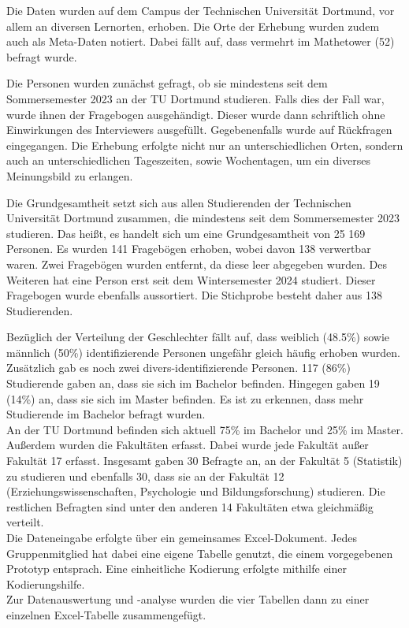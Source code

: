\documentclass[11pt, a4paper]{article}
\begin{document}
Die Daten wurden auf dem Campus der Technischen Universität Dortmund, vor allem an diversen Lernorten, erhoben. Die Orte der Erhebung wurden zudem auch als Meta-Daten notiert. Dabei fällt auf, dass vermehrt im Mathetower (52) befragt wurde.

Die Personen wurden zunächst gefragt, ob sie mindestens seit dem Sommersemester 2023 an der TU Dortmund studieren. Falls dies der Fall war, wurde ihnen der Fragebogen ausgehändigt. Dieser wurde dann schriftlich ohne Einwirkungen des Interviewers ausgefüllt. Gegebenenfalls wurde auf Rückfragen eingegangen.
Die Erhebung erfolgte nicht nur an unterschiedlichen Orten, sondern auch an unterschiedlichen Tageszeiten, sowie Wochentagen, um ein diverses Meinungsbild zu erlangen.

Die Grundgesamtheit setzt sich aus allen Studierenden der Technischen Universität Dortmund zusammen, die mindestens seit dem Sommersemester 2023 studieren. Das heißt, es handelt sich um eine Grundgesamtheit von 25 169 Personen. 
Es wurden 141 Fragebögen erhoben, wobei davon 138 verwertbar waren. Zwei Fragebögen wurden entfernt, da diese leer abgegeben wurden. Des Weiteren hat eine Person erst seit dem Wintersemester 2024 studiert. Dieser Fragebogen wurde ebenfalls aussortiert.
Die Stichprobe besteht daher aus 138 Studierenden.

Bezüglich der Verteilung der Geschlechter fällt auf, dass weiblich (48.5\%) sowie männlich (50\%) identifizierende Personen ungefähr gleich häufig erhoben wurden. Zusätzlich gab es noch zwei divers-identifizierende Personen. 
117 (86\%) Studierende gaben an, dass sie sich im Bachelor befinden. Hingegen gaben        19 (14\%) an, dass sie sich im Master befinden. Es ist zu erkennen, dass mehr Studierende im Bachelor befragt wurden. \\
An der TU Dortmund befinden sich aktuell 75\% im Bachelor und 25\% im Master.\\
Außerdem wurden die Fakultäten erfasst. Dabei wurde jede Fakultät außer Fakultät 17 erfasst. Insgesamt gaben 30 Befragte an, an der Fakultät 5 (Statistik) zu studieren und ebenfalls 30, dass sie an der Fakultät 12 (Erziehungswissenschaften, Psychologie und Bildungsforschung) studieren. Die restlichen Befragten sind unter den anderen 14 Fakultäten etwa gleichmäßig verteilt.\\

Die Dateneingabe erfolgte über ein gemeinsames Excel-Dokument. Jedes Gruppenmitglied hat dabei eine eigene Tabelle genutzt, die einem vorgegebenen Prototyp entsprach. Eine einheitliche Kodierung erfolgte mithilfe einer Kodierungshilfe. \\
Zur Datenauswertung und -analyse wurden die vier Tabellen dann zu einer einzelnen Excel-Tabelle zusammengefügt. \\
\end{document}
